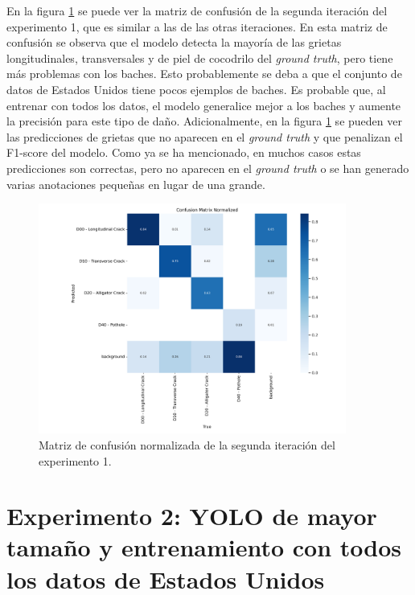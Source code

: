 En la figura \ref{fig:exp1-cv1-confusion_matrix_normalized} se puede ver la matriz de confusión de la segunda iteración del experimento 1, que es similar a las de las otras iteraciones. En esta matriz de confusión se observa que el modelo detecta la mayoría de las grietas longitudinales, transversales y de piel de cocodrilo del \textit{ground truth}, pero tiene más problemas con los baches. Esto probablemente se deba a que el conjunto de datos de Estados Unidos tiene pocos ejemplos de baches. Es probable que, al entrenar con todos los datos, el modelo generalice mejor a los baches y aumente la precisión para este tipo de daño. Adicionalmente, en la figura \ref{fig:exp1-cv1-confusion_matrix_normalized} se pueden ver las predicciones de grietas que no aparecen en el \textit{ground truth} y que penalizan el F1-score del modelo. Como ya se ha mencionado, en muchos casos estas predicciones son correctas, pero no aparecen en el \textit{ground truth} o se han generado varias anotaciones pequeñas en lugar de una grande.

\begin{figure}[H]
    \centering
    \includegraphics[width=0.9\textwidth]{img/exp1-cv1-confusion_matrix_normalized.png}
    \caption{Matriz de confusión normalizada de la segunda iteración del experimento 1.}
    \label{fig:exp1-cv1-confusion_matrix_normalized}
\end{figure}

\section{Experimento 2: YOLO de mayor tamaño y entrenamiento con todos los datos de Estados Unidos}\label{SEC:EXP2}


